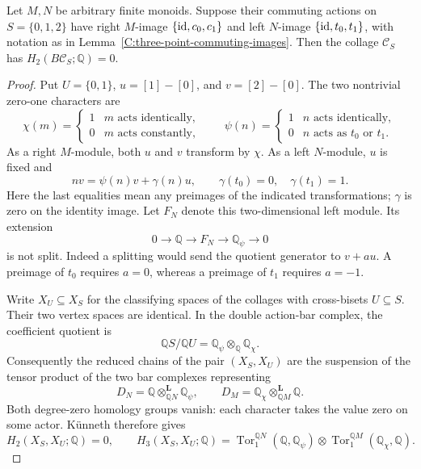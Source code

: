 \begin{lemma}
\label{C:three-state-residual-H2zero}
Let $M,N$ be arbitrary finite monoids.  Suppose their commuting
actions on $S=\{0,1,2\}$ have right $M$-image
$\{\mathrm {id},c_0,c_1\}$ and left $N$-image
$\{\mathrm {id},t_0,t_1\}$, with notation as in
Lemma~\ref{C:three-point-commuting-images}.
Then the collage $\mathcal C_S$ has
$H_2(B\mathcal C_S;\mathbb Q)=0$.
\end{lemma}
\begin{proof}
Put $U=\{0,1\}$, $u=[1]-[0]$, and $v=[2]-[0]$.
The two nontrivial zero-one characters are
\[
 \chi(m)=\begin{cases}1& m\text{ acts identically},\\0&
 m\text{ acts constantly},\end{cases}
 \qquad
 \psi(n)=\begin{cases}1& n\text{ acts identically},\\0&
 n\text{ acts as }t_0\text{ or }t_1.\end{cases}
\]
As a right $M$-module, both $u$ and $v$ transform by $\chi$.
As a left $N$-module, $u$ is fixed and
\[
 n v=\psi(n)v+\gamma(n)u,
 \qquad \gamma(t_0)=0,\quad\gamma(t_1)=1.
\]
Here the last equalities mean any preimages of the indicated
transformations; $\gamma$ is zero on the identity image.
Let $F_N$ denote this two-dimensional left module.  Its extension
\begin{equation}\label{C:three-state-gamma-extension}
 0\longrightarrow\mathbb Q\longrightarrow F_N
 \longrightarrow\mathbb Q_\psi\longrightarrow0
\end{equation}
is not split.  Indeed a splitting would send the quotient generator
to $v+a u$.  A preimage of $t_0$ requires $a=0$, whereas a preimage
of $t_1$ requires $a=-1$.

Write $X_U\subseteq X_S$ for the classifying spaces of the
collages with cross-bisets $U\subseteq S$.
Their two vertex spaces are identical.  In the double action-bar
complex, the coefficient quotient is
\[
 \mathbb QS/\mathbb QU
   =\mathbb Q_\psi\otimes_{\mathbb Q}\mathbb Q_\chi.
\]
Consequently the reduced chains of the pair $(X_S,X_U)$ are
the suspension of the tensor product of the two bar complexes
representing
\[
 D_N=\mathbb Q\otimes^{\mathbf L}_{\mathbb QN}\mathbb Q_\psi,
 \qquad
 D_M=\mathbb Q_\chi\otimes^{\mathbf L}_{\mathbb QM}\mathbb Q.
\]
Both degree-zero homology groups vanish: each character takes
the value zero on some actor.  K\"unneth therefore gives
\[
 H_2(X_S,X_U;\mathbb Q)=0,
 \qquad
 H_3(X_S,X_U;\mathbb Q)
 =\operatorname{Tor}^{\mathbb QN}_1(\mathbb Q,\mathbb Q_\psi)
   \otimes
   \operatorname{Tor}^{\mathbb QM}_1(\mathbb Q_\chi,\mathbb Q).
\]


\end{proof}
